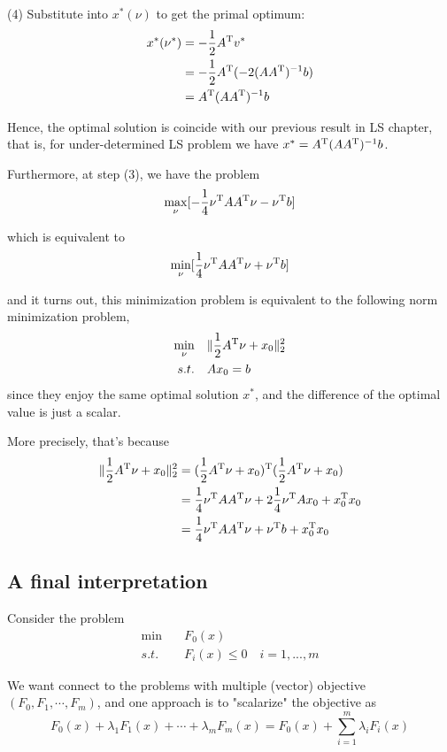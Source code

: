 \begin{example}
	(4) Substitute into $x^*(\nu)$ to get the primal optimum:
	\begin{align*}
	x^*(\nu^*) 
	&=-\frac{1}{2} A^{{\rm T}} v^* \\
	&= -\frac{1}{2}A^{{\rm T}}(-2(AA^{{\rm T}})^{-1}b)\\
	&= A^{{\rm T}}(AA^{{\rm T}})^{-1}b
	\end{align*}

Hence, the optimal solution is coincide with our previous result in LS chapter, that is, for under-determined LS problem we have $x^* = A^{{\rm T}}(AA^{{\rm T}})^{-1}b$.

Furthermore, at step (3), we have the problem
$$\max_{\nu} [- \frac{1}{4}\nu^{{\rm T}}AA^{{\rm T}}\nu - \nu^{{\rm T}}b ]$$

which is equivalent to 
$$\min_{\nu} [\frac{1}{4}\nu^{{\rm T}}AA^{{\rm T}}\nu + \nu^{{\rm T}}b ]$$

and it turns out, this minimization problem is equivalent to the following norm minimization problem,
\begin{align*}
\min_\nu\quad & \Vert\frac{1}{2}A^{{\rm T}}\nu + x_0\Vert^2_2\\
s.t.\quad & Ax_0 = b 
\end{align*}
since they enjoy the same optimal solution $x^*$, and the difference of the optimal value is just a scalar.

More precisely, that's because
\begin{align*}
	\Vert \frac{1}{2}A^{{\rm T}}\nu + x_0\Vert_2^2 
	&= (\frac{1}{2}A^{{\rm T}}\nu+x_0)^{{\rm T}}(\frac{1}{2}A^{{\rm T}}\nu+x_0)\\
	&= \frac{1}{4}\nu^{{\rm T}}AA^{{\rm T}}\nu + 2\frac{1}{4}\nu^{{\rm T}}Ax_0 + x_0^{{\rm T}}x_0\\
	&= \frac{1}{4}\nu^{{\rm T}}AA^{{\rm T}}\nu + \nu^{{\rm T}}b+x_0^{{\rm T}}x_0
\end{align*}

\end{example}


\subsection{A final interpretation}
Consider the problem
\begin{align*}
	\min \quad & F_0(x)\\
	s.t. \quad & F_i(x)\leq 0\quad i = 1,...,m
\end{align*}

We want connect to the problems with multiple (vector) objective $(F_0,F_1,\cdots,F_m)$, and one approach is to "scalarize" the objective as 
\begin{equation*}
	F_0(x) + \lambda_1 F_1(x) + \cdots + \lambda_mF_m(x) = F_0(x) + \sum^m_{i=1}\lambda_iF_i(x)
\end{equation*}

